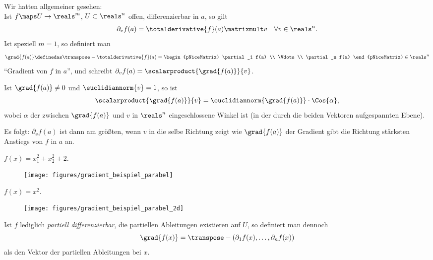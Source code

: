 \begin{bemdef}
    Wir hatten allgemeiner gesehen:\\
    Ist \( f\maps U\to \reals^m \), \( U\subset \reals^n \) offen, differenzierbar in \( a \), so gilt
    \begin{align*}
        \partial_v f(a)= \totalderivative{f}(a)\matrixmult v\quad \forall v\in \reals^n.
    \end{align*}
    Ist speziell \( m=1 \), so definiert man
    \begin{align*}
        \grad{f(a)}\definedas \transpose-{\totalderivative{f}(a)}=\begin{pNiceMatrix} \partial_1 f(a) \\ \Vdots \\ \partial_n f(a) \end{pNiceMatrix}\in \reals^n
    \end{align*}
    \enquote{Gradient von \( f \) in \( a \)}, und schreibt \( \partial_v f(a)=\scalarproduct{\grad{f(a)}}{v} \).

    Ist \( \grad{f(a)}\neq 0 \) und \( \euclidiannorm{v}=1 \), so ist
    \begin{equation*}
        \scalarproduct{\grad{f(a)}}{v}=\euclidiannorm{\grad{f(a)}}\cdot\Cos{\alpha},
    \end{equation*}
    wobei \( \alpha \) der zwischen \( \grad{f(a)} \) und \( v \) in \( \reals^n \) eingeschlossene Winkel ist (in der durch die beiden Vektoren aufgespannten Ebene).

    Es folgt: \( \partial_v f(a) \) ist dann am größten, wenn \( v \) in die selbe Richtung zeigt wie \( \grad{f(a)} \) \timplies der Gradient gibt die Richtung stärksten Anstiegs von \( f \) in \( a \) an.
\end{bemdef}
\begin{beispiel*}
    \( f(x)=x_1^2+x_2^2+2 \).
    \begin{figure}[H]
        \centering
        \texttt{[image: figures/gradient\_beispiel\_parabel]}
        \label{fig:gradient_beispiel_parabel}
    \end{figure}
\end{beispiel*}
\begin{beispiel*}
    \( f(x)=x^2 \).
    \begin{figure}[H]
        \centering
        \texttt{[image: figures/gradient\_beispiel\_parabel\_2d]}
        \label{fig:gradient_beispiel_parabel_2d}
    \end{figure}
    Ist \( f \) lediglich \emph{partiell differenzierbar}, \dh  die partiellen Ableitungen existieren auf \( U \), so definiert man dennoch
    \begin{equation*}
        \grad{f(x)}=\transpose-{(\partial_1 f(x),\dotsc, \partial_n f(x))}
    \end{equation*}
    als den Vektor der partiellen Ableitungen bei \( x \).
\end{beispiel*}
